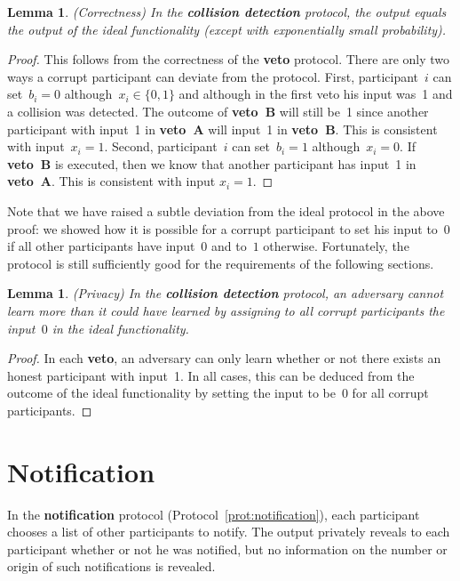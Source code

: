 \documentclass[11pt]{article}
\newtheorem{lemma}[theorem]{Lemma}
\begin{document}
\begin{lemma}(Correctness)
In the \textbf{collision detection} protocol, the output equals the
output of the ideal functionality (except with exponentially small
probability).
\end{lemma}

\begin{proof}
This follows from the correctness of the \textbf{veto} protocol.
There are only two ways a corrupt participant can deviate from the
protocol. First, participant~$i$ can set~$b_i = 0$ although~$x_i \in
\{0,1\}$ and although in the first veto his input was~1 and a
collision was detected. The outcome of \textbf{veto~B} will still
be~1 since another participant with input~1 in \textbf{veto~A} will
input~1 in \textbf{veto~B}. This is consistent with input~$x_i=1$.
Second, participant~$i$ can set~$b_i =1$ although~$x_i=0$. If
\textbf{veto~B} is executed, then we know that another participant
has input~1 in \textbf{veto~A}.
 This is  consistent with input $x_i=1$. \end{proof}

Note that we have raised a subtle deviation from the ideal protocol
in the above proof:   we showed how it is possible for a corrupt
participant to set his input to~0 if all other participants have
input~$0$ and to~$1$ otherwise. Fortunately, the protocol is still
sufficiently good for the requirements of the following sections.


\begin{lemma}(Privacy)
In the \textbf{collision detection}  protocol, an adversary cannot
learn more than it could have learned by assigning to all corrupt
participants the input~$0$ in the ideal functionality.
\end{lemma}

\begin{proof}
In each \textbf{veto}, an adversary  can only learn whether or not
there exists an honest participant with input~1. In all cases, this
can be deduced from the outcome of the ideal functionality by
setting the input to be~$0$ for all corrupt participants.
\end{proof}


\section{Notification}
\label{sec:notification}

In the \textbf{notification} protocol
(Protocol~\ref{prot:notification}), each participant chooses a list
of other participants to notify. The output privately reveals to
each participant whether or not he was notified, but no information
on the number or origin of such notifications is revealed.
\end{document}
